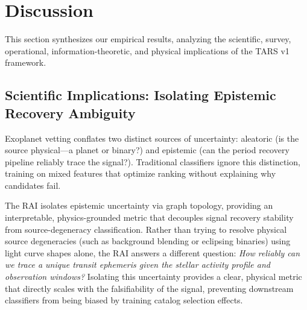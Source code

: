 \section{Discussion} \label{sec:discussion}

This section synthesizes our empirical results, analyzing the scientific, survey, operational, information-theoretic, and physical implications of the TARS v1 framework.

\subsection{Scientific Implications: Isolating Epistemic Recovery Ambiguity} \label{sec:disc_epistemic}
Exoplanet vetting conflates two distinct sources of uncertainty: aleatoric (is the source physical—a planet or binary?) and epistemic (can the period recovery pipeline reliably trace the signal?). Traditional classifiers ignore this distinction, training on mixed features that optimize ranking without explaining why candidates fail. 

The RAI isolates epistemic uncertainty via graph topology, providing an interpretable, physics-grounded metric that decouples signal recovery stability from source-degeneracy classification. Rather than trying to resolve physical source degeneracies (such as background blending or eclipsing binaries) using light curve shapes alone, the RAI answers a different question: \textit{How reliably can we trace a unique transit ephemeris given the stellar activity profile and observation windows?} Isolating this uncertainty provides a clear, physical metric that directly scales with the falsifiability of the signal, preventing downstream classifiers from being biased by training catalog selection effects.

